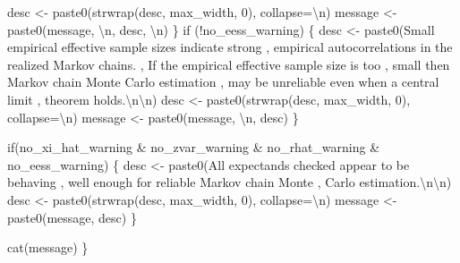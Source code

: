 \documentclass[
  letterpaper,
  DIV=11,
  numbers=noendperiod]{scrartcl}
\newenvironment{Shaded}{\begin{snugshade}}{\end{snugshade}}
\newcommand{\CharTok}[1]{\textcolor[rgb]{0.13,0.47,0.30}{#1}}
\newcommand{\ControlFlowTok}[1]{\textcolor[rgb]{0.00,0.23,0.31}{#1}}
\newcommand{\DecValTok}[1]{\textcolor[rgb]{0.68,0.00,0.00}{#1}}
\newcommand{\NormalTok}[1]{\textcolor[rgb]{0.00,0.23,0.31}{#1}}
\newcommand{\OperatorTok}[1]{\textcolor[rgb]{0.37,0.37,0.37}{#1}}
\newcommand{\StringTok}[1]{\textcolor[rgb]{0.13,0.47,0.30}{#1}}
\begin{document}
\begin{Shaded}
\begin{Highlighting}[]
\NormalTok{    desc }\OperatorTok{\textless{}{-}}\NormalTok{ paste0(strwrap(desc, max\_width, }\DecValTok{0}\NormalTok{), collapse}\OperatorTok{=}\StringTok{\textquotesingle{}}\CharTok{\textbackslash{}n}\StringTok{\textquotesingle{}}\NormalTok{)}
\NormalTok{    message }\OperatorTok{\textless{}{-}}\NormalTok{ paste0(message, }\StringTok{\textquotesingle{}}\CharTok{\textbackslash{}n}\StringTok{\textquotesingle{}}\NormalTok{, desc, }\StringTok{\textquotesingle{}}\CharTok{\textbackslash{}n}\StringTok{\textquotesingle{}}\NormalTok{)}
\NormalTok{  \}}
  \ControlFlowTok{if}\NormalTok{ (}\OperatorTok{!}\NormalTok{no\_eess\_warning) \{}
\NormalTok{    desc }\OperatorTok{\textless{}{-}}\NormalTok{ paste0(}\StringTok{\textquotesingle{}Small empirical effective sample sizes indicate strong \textquotesingle{}}\NormalTok{,}
                   \StringTok{\textquotesingle{}empirical autocorrelations in the realized Markov chains. \textquotesingle{}}\NormalTok{,}
                   \StringTok{\textquotesingle{}If the empirical effective sample size is too \textquotesingle{}}\NormalTok{,}
                   \StringTok{\textquotesingle{}small then Markov chain Monte Carlo estimation \textquotesingle{}}\NormalTok{,}
                   \StringTok{\textquotesingle{}may be unreliable even when a central limit \textquotesingle{}}\NormalTok{,}
                   \StringTok{\textquotesingle{}theorem holds.}\CharTok{\textbackslash{}n\textbackslash{}n}\StringTok{\textquotesingle{}}\NormalTok{)}
\NormalTok{    desc }\OperatorTok{\textless{}{-}}\NormalTok{ paste0(strwrap(desc, max\_width, }\DecValTok{0}\NormalTok{), collapse}\OperatorTok{=}\StringTok{\textquotesingle{}}\CharTok{\textbackslash{}n}\StringTok{\textquotesingle{}}\NormalTok{)}
\NormalTok{    message }\OperatorTok{\textless{}{-}}\NormalTok{ paste0(message, }\StringTok{\textquotesingle{}}\CharTok{\textbackslash{}n}\StringTok{\textquotesingle{}}\NormalTok{, desc)}
\NormalTok{  \}}

  \ControlFlowTok{if}\NormalTok{(no\_xi\_hat\_warning }\OperatorTok{\&}\NormalTok{ no\_zvar\_warning }\OperatorTok{\&} 
\NormalTok{     no\_rhat\_warning }\OperatorTok{\&}\NormalTok{ no\_eess\_warning) \{}
\NormalTok{    desc }\OperatorTok{\textless{}{-}}\NormalTok{ paste0(}\StringTok{\textquotesingle{}All expectands checked appear to be behaving \textquotesingle{}}\NormalTok{,}
                   \StringTok{\textquotesingle{}well enough for reliable Markov chain Monte \textquotesingle{}}\NormalTok{,}
                   \StringTok{\textquotesingle{}Carlo estimation.}\CharTok{\textbackslash{}n\textbackslash{}n}\StringTok{\textquotesingle{}}\NormalTok{)}
\NormalTok{    desc }\OperatorTok{\textless{}{-}}\NormalTok{ paste0(strwrap(desc, max\_width, }\DecValTok{0}\NormalTok{), collapse}\OperatorTok{=}\StringTok{\textquotesingle{}}\CharTok{\textbackslash{}n}\StringTok{\textquotesingle{}}\NormalTok{)}
\NormalTok{    message }\OperatorTok{\textless{}{-}}\NormalTok{ paste0(message, desc)}
\NormalTok{  \}}

\NormalTok{  cat(message)}
\NormalTok{\}}
\end{Highlighting}
\end{Shaded}
\end{document}
